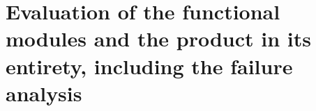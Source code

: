 \chapter{Evaluation of the functional modules and the product in its entirety, including the failure analysis}